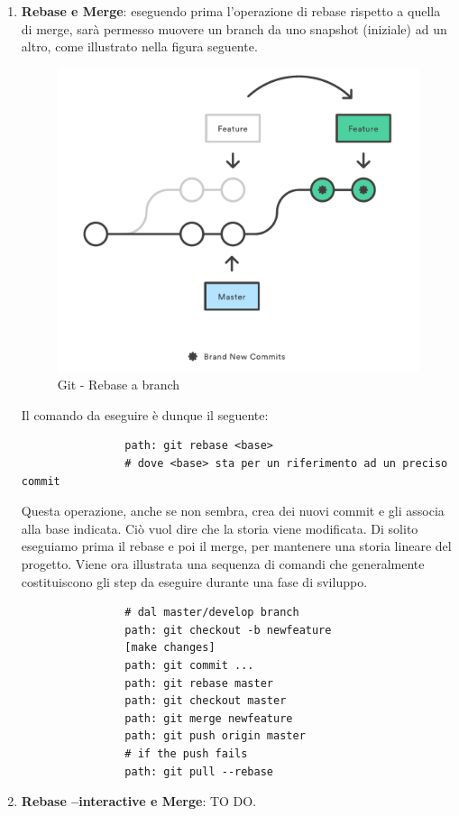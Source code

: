 \begin{enumerate}
				\item \textbf{Rebase e Merge}: eseguendo prima l'operazione di rebase rispetto a quella di merge, sarà permesso muovere un branch da uno snapshot (iniziale) ad un altro, come illustrato nella figura seguente.
					\begin{figure}[htbp]
						\centering
						\includegraphics[scale=0.6]{images/rebase.pdf}
						\caption{Git - Rebase a branch}
						\label{fig:git_rebase_a_branch}
					\end{figure}
				Il comando da eseguire è dunque il seguente:
				\begin{verbatim}
				path: git rebase <base>
				# dove <base> sta per un riferimento ad un preciso commit
				\end{verbatim}
				Questa operazione, anche se non sembra, crea dei nuovi commit e gli associa alla base indicata. Ciò vuol dire che la storia viene modificata. \newline
				Di solito eseguiamo prima il rebase e poi il merge, per mantenere una storia lineare del progetto. Viene ora illustrata una sequenza di comandi che generalmente costituiscono gli step da eseguire durante una fase di sviluppo.
				\begin{verbatim}
				# dal master/develop branch
				path: git checkout -b newfeature
				[make changes]
				path: git commit ...
				path: git rebase master
				path: git checkout master
				path: git merge newfeature
				path: git push origin master
				# if the push fails
				path: git pull --rebase
				\end{verbatim}

				\item \textbf{Rebase --interactive e Merge}: TO DO.

			\end{enumerate}
